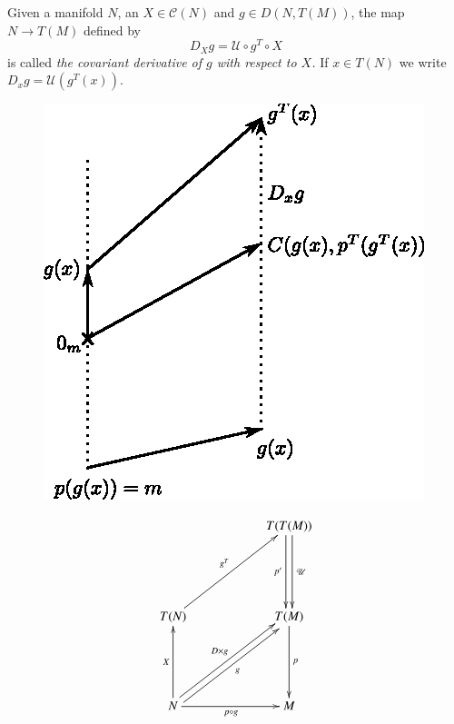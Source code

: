 \begin{defi*}
Given a manifold $N$, an $X\in\mathscr{C}(N)$ and $g\in D(N,T(M))$,
the map $N\to T(M)$ defined by
\begin{equation*}
D_{X}g=\mathscr{U}\circ g^{T}\circ X \tag{2.3.2}\label{chap2:2.3.2}
\end{equation*}
is called {\em the covariant derivative of $g$ with respect to $X$.}
If $x\in T(N)$ we write $D_{x}g=\mathcal{U}(g^{T}(x))$.

\begin{center}
\begin{minipage}[c]{6cm}
\begin{figure}[H]
\centering
\includegraphics{chap2-fig1.eps}
\end{figure}
\end{minipage}
\begin{minipage}[c]{6cm}
\[
\xymatrix@=2cm{
 & T(T(M))\ar@<-2.5pt>[d]_{p'}\ar@<2.5pt>[d]^{\mathscr{U}}\\
T(N)\ar[ur]^{g^{T}} & T(M)\ar[d]^{p}\\
N\ar[u]^{X}\ar@<2.5pt>[ur]^{D\times g}\ar@<-2.5pt>[ur]_{g}\ar[r]_{p\circ g} & M
}
\]
\end{minipage}
\end{center}
\end{defi*}

